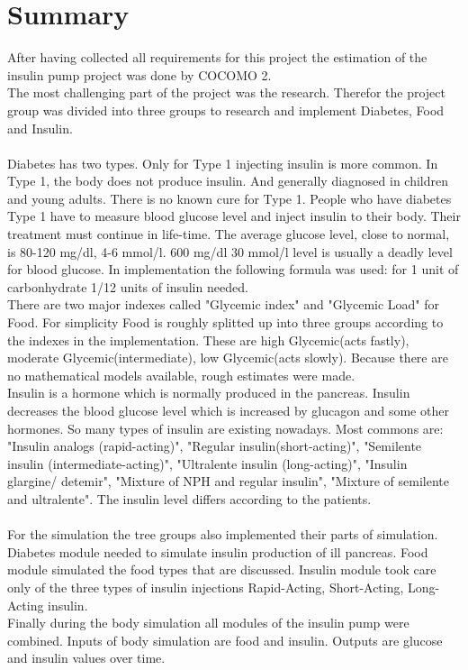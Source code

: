 \documentclass[pdflatex,a4paper,11pt,english]{scrreprt}
\begin{document}
\section{Summary}
After having collected all requirements for this project the estimation of the insulin pump project was done by COCOMO 2.\\
The most challenging part of the project was the research. Therefor the project group was divided into three groups to research and implement Diabetes, Food and Insulin.
\\ \\
Diabetes has two types. Only for Type 1 injecting insulin is more common. In Type 1, the body does not produce insulin. And generally diagnosed in children and young adults. There is no known cure for Type 1. People who have diabetes Type 1 have to measure blood glucose level and inject insulin to their body. Their treatment must continue in life-time. The average glucose level, close to normal, is 80-120 mg/dl, 4-6 mmol/l. 600 mg/dl 30 mmol/l level is usually a deadly level for blood glucose. In implementation the following formula was used: for 1 unit of carbonhydrate 1/12 units of insulin needed.\\
There are two major indexes called "Glycemic index" and "Glycemic Load" for Food. 
For simplicity Food is roughly splitted up into three groups according to the indexes in the implementation. These are high Glycemic(acts fastly), moderate Glycemic(intermediate), low Glycemic(acts slowly). Because there are no mathematical models available, rough estimates were made. \\
Insulin is a hormone which is normally produced in the pancreas. Insulin decreases the blood glucose level which is increased by glucagon and some other hormones.  So many types of insulin are existing nowadays. Most commons are: "Insulin analogs (rapid-acting)", "Regular insulin(short-acting)", "Semilente insulin (intermediate-acting)", "Ultralente insulin (long-acting)", "Insulin glargine/ detemir", "Mixture of NPH and regular insulin", "Mixture of semilente and ultralente". The insulin level differs according to the patients. 
\\ \\
For the simulation the tree groups also implemented their parts of simulation. Diabetes module needed to simulate insulin production of ill pancreas. Food module simulated the food types that are discussed. Insulin module took care only of the three types of insulin injections Rapid-Acting, Short-Acting, Long-Acting insulin. \\ 
Finally during the body simulation all modules of the insulin pump were combined. Inputs of body simulation are food and insulin. Outputs are glucose and insulin values over time. 
\end{document}
